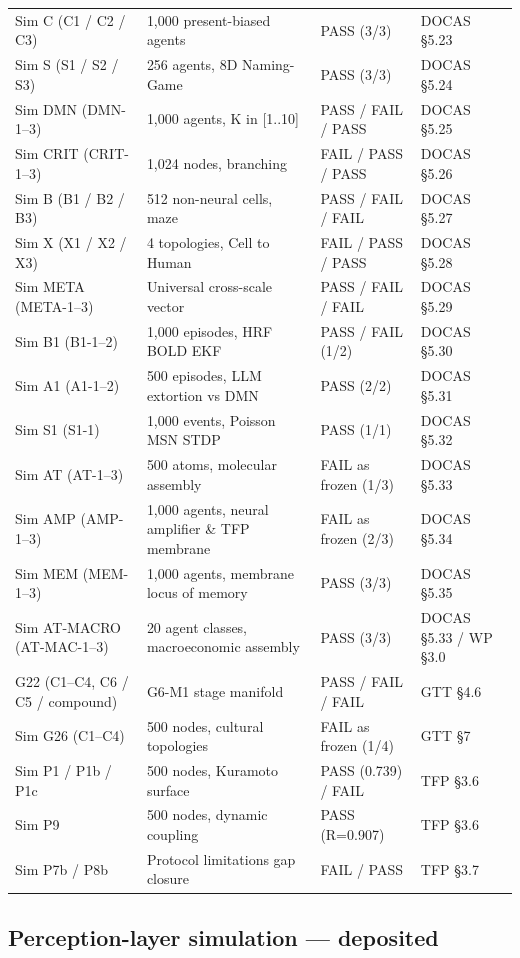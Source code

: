 \documentclass[11pt]{article}
\begin{document}
{\begin{tabular}{@{}p{3.4cm}lp{4.5cm}l@{}}
Sim C (C1 / C2 / C3) & 1,000 present-biased agents & PASS (3/3) & DOCAS \S{}5.23 \\
Sim S (S1 / S2 / S3) & 256 agents, 8D Naming-Game & PASS (3/3) & DOCAS \S{}5.24 \\
Sim DMN (DMN-1--3) & 1,000 agents, K in [1..10] & PASS / FAIL / PASS & DOCAS \S{}5.25 \\
Sim CRIT (CRIT-1--3) & 1,024 nodes, branching & FAIL / PASS / PASS & DOCAS \S{}5.26 \\
Sim B (B1 / B2 / B3) & 512 non-neural cells, maze & PASS / FAIL / FAIL & DOCAS \S{}5.27 \\
Sim X (X1 / X2 / X3) & 4 topologies, Cell to Human & FAIL / PASS / PASS & DOCAS \S{}5.28 \\
Sim META (META-1--3) & Universal cross-scale vector & PASS / FAIL / FAIL & DOCAS \S{}5.29 \\
Sim B1 (B1-1--2) & 1,000 episodes, HRF BOLD EKF & PASS / FAIL (1/2) & DOCAS \S{}5.30 \\
Sim A1 (A1-1--2) & 500 episodes, LLM extortion vs DMN & PASS (2/2) & DOCAS \S{}5.31 \\
Sim S1 (S1-1) & 1,000 events, Poisson MSN STDP & PASS (1/1) & DOCAS \S{}5.32 \\
Sim AT (AT-1--3) & 500 atoms, molecular assembly & FAIL as frozen (1/3) & DOCAS \S{}5.33 \\
Sim AMP (AMP-1--3) & 1,000 agents, neural amplifier \& TFP membrane & FAIL as frozen (2/3) & DOCAS \S{}5.34 \\
Sim MEM (MEM-1--3) & 1,000 agents, membrane locus of memory & PASS (3/3) & DOCAS \S{}5.35 \\
Sim AT-MACRO (AT-MAC-1--3) & 20 agent classes, macroeconomic assembly & PASS (3/3) & DOCAS \S{}5.33 / WP \S{}3.0 \\
G22 (C1--C4, C6 / C5 / compound) & G6-M1 stage manifold & PASS / FAIL / FAIL & GTT \S{}4.6 \\
Sim G26 (C1--C4) & 500 nodes, cultural topologies & FAIL as frozen (1/4) & GTT \S{}7 \\
Sim P1 / P1b / P1c & 500 nodes, Kuramoto surface & PASS (0.739) / FAIL & TFP \S{}3.6 \\
Sim P9 & 500 nodes, dynamic coupling & PASS (R=0.907) & TFP \S{}3.6 \\
Sim P7b / P8b & Protocol limitations gap closure & FAIL / PASS & TFP \S{}3.7 \\
\hline
\end{tabular}}

\subsection*{Perception-layer simulation --- deposited}
\end{document}
